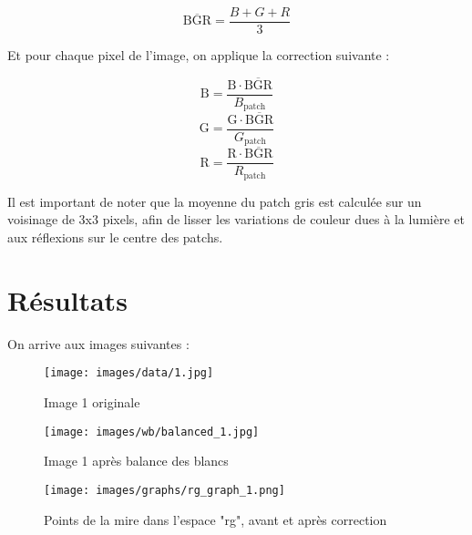 \documentclass[12pt]{article}
\begin{document}
\begin{equation}
    \overline{\text{BGR}} = \frac{B + G + R}{3}
\end{equation}

Et pour chaque pixel de l'image, on applique la correction suivante :

\begin{equation}
    \text{B} = \frac{\text{B} \cdot \overline{\text{BGR}}}{B_{\text{patch}}}
\end{equation}
\begin{equation}
    \text{G} = \frac{\text{G} \cdot \overline{\text{BGR}}}{G_{\text{patch}}}
\end{equation}
\begin{equation}
    \text{R} = \frac{\text{R} \cdot \overline{\text{BGR}}}{R_{\text{patch}}}
\end{equation}

Il est important de noter que la moyenne du patch gris est calculée sur un voisinage de 3x3 pixels, afin de lisser les variations de couleur dues à la lumière et aux réflexions sur le centre des patchs.

\clearpage

\section{Résultats}

On arrive aux images suivantes :

\begin{figure}[H]
    \centering
    \begin{minipage}{0.32\textwidth}
        \centering
        \texttt{[image: images/data/1.jpg]}
        \caption{Image 1 originale}
    \end{minipage}
    \hfill
    \begin{minipage}{0.32\textwidth}
        \centering
        \texttt{[image: images/wb/balanced\_1.jpg]}
        \caption{Image 1 après balance des blancs}
    \end{minipage}
    \hfill
    \begin{minipage}{0.32\textwidth}
        \centering
        \texttt{[image: images/graphs/rg\_graph\_1.png]}
        \caption{Points de la mire dans l'espace "rg", avant et après correction}
    \end{minipage}
\end{figure}
\end{document}
